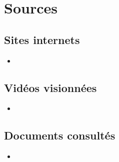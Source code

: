 \chapter{Sources}
\section{Sites internets}
\begin{itemize}
    \item 
\end{itemize}
\section{Vidéos visionnées}
\begin{itemize}
    \item 
\end{itemize}
\section{Documents consultés}
\begin{itemize}
    \item 
\end{itemize}